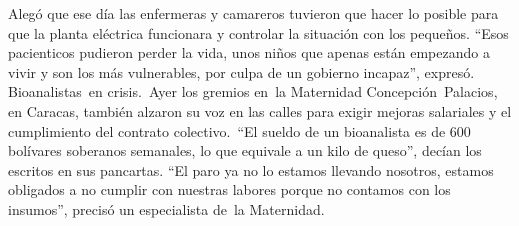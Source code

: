 \documentclass{article}%
\begin{document}
\newline%
%
Alegó que ese día las enfermeras y camareros tuvieron que hacer lo posible para que la planta eléctrica funcionara y controlar la situación con los pequeños. “Esos pacienticos pudieron perder la vida, unos niños que apenas están empezando a vivir y son los más vulnerables, por culpa de un gobierno incapaz”, expresó.%
\newline%
%
Bioanalistas~en crisis.~Ayer los gremios en~la Maternidad Concepción~Palacios, en Caracas, también alzaron su voz en las calles para exigir mejoras salariales y el cumplimiento del contrato colectivo.~“El sueldo de un bioanalista es de 600 bolívares soberanos semanales, lo que equivale a un kilo de queso”, decían los escritos en sus pancartas. “El paro ya no lo estamos llevando nosotros, estamos obligados a no cumplir con nuestras labores porque no contamos con los insumos”, precisó un especialista de~la Maternidad.%
\newline%
%
\end{document}
